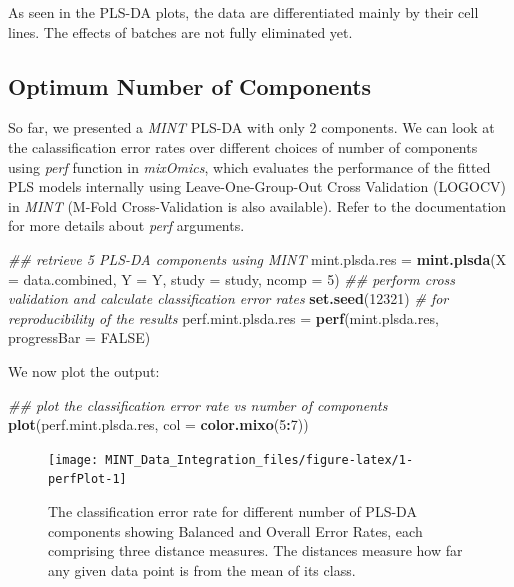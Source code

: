 \documentclass[]{book}
\newenvironment{Shaded}{\begin{snugshade}}{\end{snugshade}}
\newcommand{\CommentTok}[1]{\textcolor[rgb]{0.56,0.35,0.01}{\textit{#1}}}
\newcommand{\DataTypeTok}[1]{\textcolor[rgb]{0.13,0.29,0.53}{#1}}
\newcommand{\DecValTok}[1]{\textcolor[rgb]{0.00,0.00,0.81}{#1}}
\newcommand{\KeywordTok}[1]{\textcolor[rgb]{0.13,0.29,0.53}{\textbf{#1}}}
\newcommand{\NormalTok}[1]{#1}
\newcommand{\OperatorTok}[1]{\textcolor[rgb]{0.81,0.36,0.00}{\textbf{#1}}}
\newcommand{\OtherTok}[1]{\textcolor[rgb]{0.56,0.35,0.01}{#1}}
\newcommand{\StringTok}[1]{\textcolor[rgb]{0.31,0.60,0.02}{#1}}
\theoremstyle{definition}
\theoremstyle{definition}
\theoremstyle{definition}
\theoremstyle{remark}
\begin{document}
As seen in the PLS-DA plots, the data are differentiated mainly by their
cell lines. The effects of batches are not fully eliminated yet.

\hypertarget{optimum-number-of-components}{%
\subsection{Optimum Number of
Components}\label{optimum-number-of-components}}

So far, we presented a \emph{MINT} PLS-DA with only 2 components. We can
look at the calassification error rates over different choices of number
of components using \emph{perf} function in \emph{mixOmics}, which
evaluates the performance of the fitted PLS models internally using
Leave-One-Group-Out Cross Validation (LOGOCV) in \emph{MINT} (M-Fold
Cross-Validation is also available). Refer to the documentation for more
details about \emph{perf} arguments.

\begin{Shaded}
\begin{Highlighting}[]
\CommentTok{## retrieve 5 PLS-DA components using MINT}
\NormalTok{mint.plsda.res =}\StringTok{ }\KeywordTok{mint.plsda}\NormalTok{(}\DataTypeTok{X =}\NormalTok{ data.combined, }\DataTypeTok{Y =}\NormalTok{ Y,}
                                 \DataTypeTok{study =}\NormalTok{ study, }\DataTypeTok{ncomp =} \DecValTok{5}\NormalTok{)}
\CommentTok{## perform cross validation and calculate classification error rates}
\KeywordTok{set.seed}\NormalTok{(}\DecValTok{12321}\NormalTok{)  }\CommentTok{# for reproducibility of the results}
\NormalTok{perf.mint.plsda.res =}\StringTok{ }\KeywordTok{perf}\NormalTok{(mint.plsda.res,}
          \DataTypeTok{progressBar =} \OtherTok{FALSE}\NormalTok{)}
\end{Highlighting}
\end{Shaded}

We now plot the output:

\begin{Shaded}
\begin{Highlighting}[]
\CommentTok{## plot the classification error rate vs number of components}
\KeywordTok{plot}\NormalTok{(perf.mint.plsda.res, }\DataTypeTok{col =} \KeywordTok{color.mixo}\NormalTok{(}\DecValTok{5}\OperatorTok{:}\DecValTok{7}\NormalTok{))}
\end{Highlighting}
\end{Shaded}

\begin{figure}[ht]

{\centering \texttt{[image: MINT\_Data\_Integration\_files/figure-latex/1-perfPlot-1]} 

}

\caption{The classification error rate for different number of PLS-DA components showing Balanced and Overall Error Rates, each comprising three distance measures. The distances measure how far any given data point is from the mean of its class.}\label{fig:1-perfPlot}
\end{figure}
\end{document}
